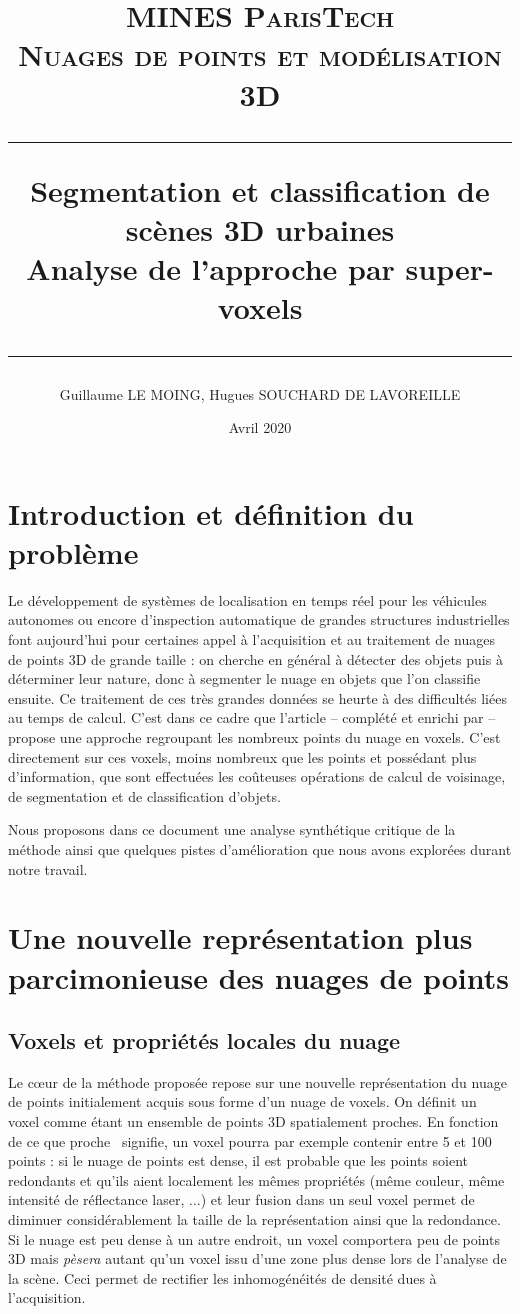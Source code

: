 \documentclass[a4paper, onecolumn, 11pt]{article}
\title{
\normalfont \normalsize
\textsc{MINES ParisTech\\ Nuages de points et modélisation 3D } \\
\vspace{2cm}\hrule\vspace{1cm}
\huge Segmentation et classification de scènes 3D urbaines \\Analyse de l'approche par super-voxels
\vspace{1cm}\hrule\vspace{1cm}
}
\author{Guillaume LE MOING, Hugues SOUCHARD DE LAVOREILLE}
\date{\vspace{12cm} Avril 2020}
\begin{document}
\maketitle

\tableofcontents

\section{Introduction et définition du problème}
Le développement de systèmes de localisation en temps réel pour les véhicules autonomes ou encore d'inspection automatique de grandes structures industrielles font aujourd'hui pour certaines appel à l'acquisition et au traitement de nuages de points 3D de grande taille : on cherche en général à détecter des objets puis à déterminer leur nature, donc à segmenter le nuage en objets que l'on classifie ensuite. Ce traitement de ces très grandes données se heurte à des difficultés liées au temps de calcul. C'est dans ce cadre que l'article \cite{aka_article} – complété et enrichi par \cite{aka_thesis} – propose une approche regroupant les nombreux points du nuage en voxels. C'est directement sur ces voxels, moins nombreux que les points et possédant plus d'information, que sont effectuées les coûteuses opérations de calcul de voisinage, de segmentation et de classification d'objets.

Nous proposons dans ce document une analyse synthétique critique de la méthode ainsi que quelques pistes d'amélioration que nous avons explorées durant notre travail.

\section{Une nouvelle représentation plus parcimonieuse des nuages de points}
\subsection{Voxels et propriétés locales du nuage}

Le cœur de la méthode proposée repose sur une nouvelle représentation du nuage de points initialement acquis sous forme d'un nuage de voxels. On définit un voxel comme étant un ensemble de points 3D spatialement proches. En fonction de ce que \og proche \fg\ signifie, un voxel pourra par exemple contenir entre 5 et 100 points : si le nuage de points est dense, il est probable que les points soient redondants et qu'ils aient localement les mêmes propriétés (même couleur, même intensité de réflectance laser, ...) et leur fusion dans un seul voxel permet de diminuer considérablement la taille de la représentation ainsi que la redondance. Si le nuage est peu dense à un autre endroit, un voxel comportera peu de points 3D mais \emph{pèsera} autant qu'un voxel issu d'une zone plus dense lors de l'analyse de la scène. Ceci permet de rectifier les inhomogénéités de densité dues à l'acquisition.
\end{document}
